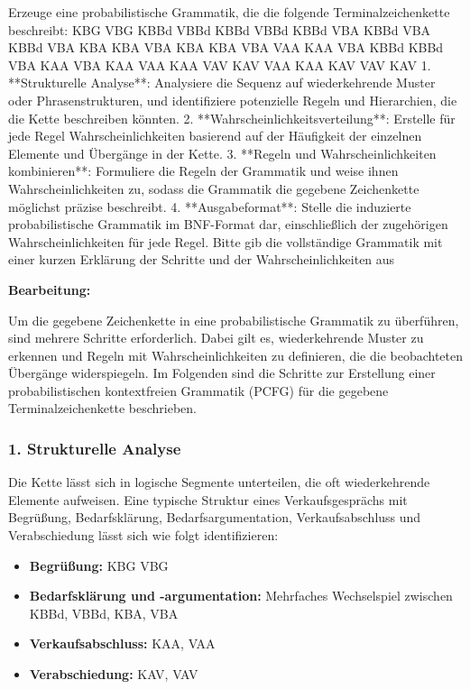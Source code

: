 \documentclass[
]{article}
\begin{document}
Erzeuge eine probabilistische Grammatik, die die folgende
Terminalzeichenkette beschreibt: KBG VBG KBBd VBBd KBBd VBBd KBBd VBA
KBBd VBA KBBd VBA KBA KBA VBA KBA KBA VBA VAA KAA VBA KBBd KBBd VBA KAA
VBA KAA VAA KAA VAV KAV VAA KAA KAV VAV KAV 1. **Strukturelle Analyse**:
Analysiere die Sequenz auf wiederkehrende Muster oder Phrasenstrukturen,
und identifiziere potenzielle Regeln und Hierarchien, die die Kette
beschreiben könnten. 2. **Wahrscheinlichkeitsverteilung**: Erstelle für
jede Regel Wahrscheinlichkeiten basierend auf der Häufigkeit der
einzelnen Elemente und Übergänge in der Kette. 3. **Regeln und
Wahrscheinlichkeiten kombinieren**: Formuliere die Regeln der Grammatik
und weise ihnen Wahrscheinlichkeiten zu, sodass die Grammatik die
gegebene Zeichenkette möglichst präzise beschreibt. 4.
**Ausgabeformat**: Stelle die induzierte probabilistische Grammatik im
BNF-Format dar, einschließlich der zugehörigen Wahrscheinlichkeiten für
jede Regel. Bitte gib die vollständige Grammatik mit einer kurzen
Erklärung der Schritte und der Wahrscheinlichkeiten aus

\textbf{Bearbeitung:}

Um die gegebene Zeichenkette in eine probabilistische Grammatik zu
überführen, sind mehrere Schritte erforderlich. Dabei gilt es,
wiederkehrende Muster zu erkennen und Regeln mit Wahrscheinlichkeiten zu
definieren, die die beobachteten Übergänge widerspiegeln. Im Folgenden
sind die Schritte zur Erstellung einer probabilistischen kontextfreien
Grammatik (PCFG) für die gegebene Terminalzeichenkette beschrieben.

\subsubsection{\texorpdfstring{\textbf{1. Strukturelle
Analyse}}{1. Strukturelle Analyse}}\label{strukturelle-analyse}

Die Kette lässt sich in logische Segmente unterteilen, die oft
wiederkehrende Elemente aufweisen. Eine typische Struktur eines
Verkaufsgesprächs mit Begrüßung, Bedarfsklärung, Bedarfsargumentation,
Verkaufsabschluss und Verabschiedung lässt sich wie folgt
identifizieren:

\begin{itemize}
\item
  \textbf{Begrüßung:} KBG VBG
\item
  \textbf{Bedarfsklärung und -argumentation:} Mehrfaches Wechselspiel
  zwischen KBBd, VBBd, KBA, VBA
\item
  \textbf{Verkaufsabschluss:} KAA, VAA
\item
  \textbf{Verabschiedung:} KAV, VAV
\end{itemize}
\end{document}
